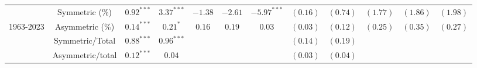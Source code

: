 \begin{tabular}{lccccccccccc}
   & Symmetric (\%) & $0.92^{***}$ & $3.37^{***}$ & $-1.38$ & $-2.61$ & $-5.97^{***}$ & $(0.16)$ & $(0.74)$ & $(1.77)$ & $(1.86)$ & $(1.98)$ \\ 
   \vspace{5pt}1963-2023 & Asymmetric (\%) & $0.14^{***}$ & $0.21^{*}$ & $0.16$ & $0.19$ & $0.03$ & $(0.03)$ & $(0.12)$ & $(0.25)$ & $(0.35)$ & $(0.27)$ \\ 
   & Symmetric/Total & $0.88^{***}$ & $0.96^{***}$ &  &  &  & $(0.14)$ & $(0.19)$ &  &  &  \\ 
   & Asymmetric/total & $0.12^{***}$ & $0.04$ &  &  &  & $(0.03)$ & $(0.04)$ &  &  &  \\ 
   \bottomrule 
\end{tabular}
